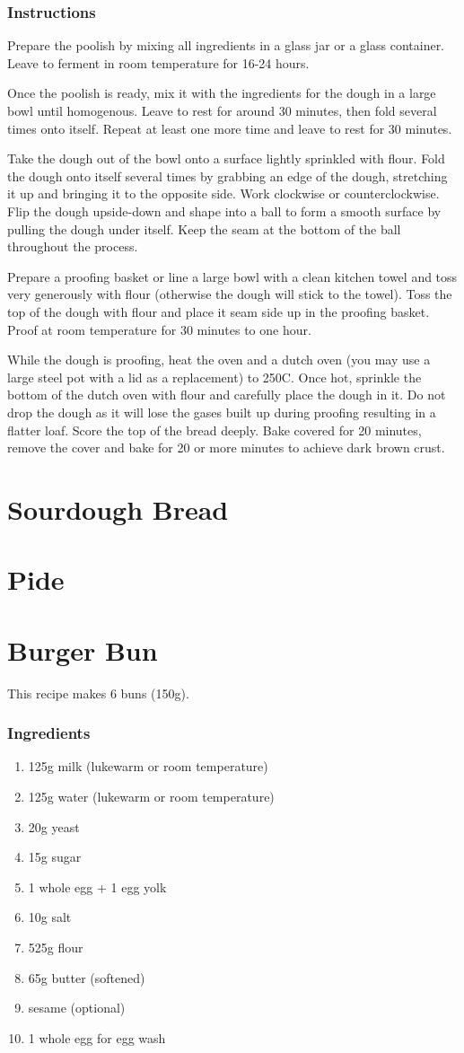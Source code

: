 \documentclass[11pt]{report}
\newcommand{\header}[1]{\subsubsection*{#1}}
\begin{document}
\header{Instructions}
Prepare the poolish by mixing all ingredients in a glass jar or a glass
container. Leave to ferment in room temperature for 16-24 hours.

Once the poolish is ready, mix it with the ingredients for the dough in a large
bowl until homogenous. Leave to rest for around 30 minutes, then fold several
times onto itself. Repeat at least one more time and leave to rest for 30
minutes.

Take the dough out of the bowl onto a surface lightly sprinkled with flour.
Fold the dough onto itself several times by grabbing an edge of the dough,
stretching it up and bringing it to the opposite side. Work clockwise or
counterclockwise. Flip the dough upside-down and shape into a ball to form a
smooth surface by pulling the dough under itself. Keep the seam at the bottom
of the ball throughout the process.

Prepare a proofing basket or line a large bowl with a clean kitchen towel and
toss very generously with flour (otherwise the dough will stick to the towel).
Toss the top of the dough with flour and place it seam side up in the proofing
basket. Proof at room temperature for 30 minutes to one hour.

While the dough is proofing, heat the oven and a dutch oven (you may use a
large steel pot with a lid as a replacement) to 250C. Once hot, sprinkle the
bottom of the dutch oven with flour and carefully place the dough in it. Do not
drop the dough as it will lose the gases built up during proofing resulting in
a flatter loaf. Score the top of the bread deeply. Bake covered for 20 minutes,
remove the cover and bake for 20 or more minutes to achieve dark brown crust.

\section{Sourdough Bread}
\section{Pide}
\section{Burger Bun}
This recipe makes 6 buns (150g).

\header{Ingredients}
\begin{enumerate}
  \item 125g milk (lukewarm or room temperature)
  \item 125g water (lukewarm or room temperature)
  \item 20g yeast
  \item 15g sugar
  \item 1 whole egg + 1 egg yolk
  \item 10g salt
  \item 525g flour
  \item 65g butter (softened)
  \item sesame (optional)
  \item 1 whole egg for egg wash
\end{enumerate}
\end{document}
